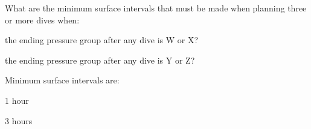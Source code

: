 	\begin{qanda}
		\begin{question}
What are the minimum surface intervals that must be made when planning three or more dives when:
			\begin{nospacenumberedlist}
				\item the ending pressure group after any dive is W or X?
				\item the ending pressure group after any dive is Y or Z?
			\end{nospacenumberedlist}
		\end{question}

		\begin{answer}
Minimum surface intervals are:
			\begin{nospacenumberedlist}
				\item 1 hour
				\item 3 hours
			\end{nospacenumberedlist}
		\end{answer}
	\end{qanda}%